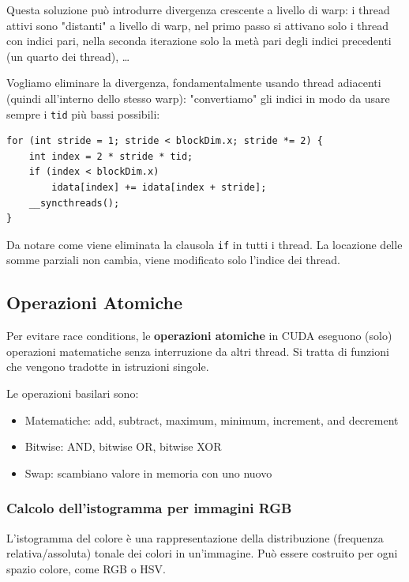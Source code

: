 Questa soluzione può introdurre divergenza crescente a livello di warp: i thread attivi sono "distanti" a livello di warp, nel primo passo si attivano solo i thread con indici pari, nella seconda iterazione solo la metà pari degli indici precedenti (un quarto dei thread), \dots

Vogliamo eliminare la divergenza, fondamentalmente usando thread adiacenti (quindi all'interno dello stesso warp): "convertiamo" gli indici in modo da usare sempre i \texttt{tid} più bassi possibili:
\begin{verbatim}
for (int stride = 1; stride < blockDim.x; stride *= 2) {
    int index = 2 * stride * tid;
    if (index < blockDim.x)
        idata[index] += idata[index + stride];
    __syncthreads();
}
\end{verbatim}

Da notare come viene eliminata la clausola \texttt{if} in tutti i thread. La locazione delle somme parziali non cambia, viene modificato solo l'indice dei thread.

\subsection{Operazioni Atomiche}

Per evitare race conditions, le \textbf{operazioni atomiche} in CUDA eseguono (solo) operazioni matematiche senza interruzione da altri thread. Si tratta di funzioni che vengono tradotte in istruzioni singole.

Le operazioni basilari sono:
\begin{itemize}
	\item Matematiche: add, subtract, maximum, minimum, increment, and decrement
	
	\item Bitwise: AND, bitwise OR, bitwise XOR
	
	\item Swap: scambiano valore in memoria con uno nuovo
\end{itemize}

\subsubsection{Calcolo dell'istogramma per immagini RGB}

L'istogramma del colore è una rappresentazione della distribuzione (frequenza relativa/assoluta) tonale dei colori in un'immagine. Può essere costruito per ogni spazio colore, come RGB o HSV.


